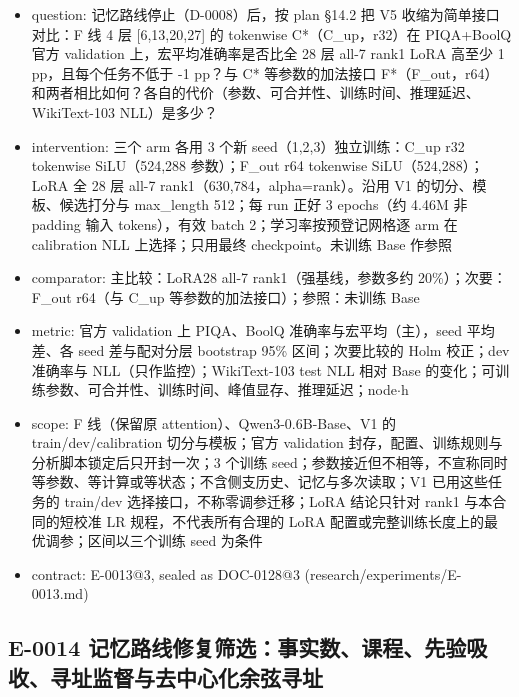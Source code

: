 \documentclass[11pt]{article}
\begin{document}
\begin{itemize}
\item question: 记忆路线停止（D-0008）后，按 plan §14.2 把 V5 收缩为简单接口对比：F 线 4 层 [6,13,20,27] 的 tokenwise C*（C\_up，r32）在 PIQA+BoolQ 官方 validation 上，宏平均准确率是否比全 28 层 all-7 rank1 LoRA 高至少 1 pp，且每个任务不低于 -1 pp？与 C* 等参数的加法接口 F*（F\_out，r64）和两者相比如何？各自的代价（参数、可合并性、训练时间、推理延迟、WikiText-103 NLL）是多少？
\item intervention: 三个 arm 各用 3 个新 seed（1,2,3）独立训练：C\_up r32 tokenwise SiLU（524,288 参数）；F\_out r64 tokenwise SiLU（524,288）；LoRA 全 28 层 all-7 rank1（630,784，alpha=rank）。沿用 V1 的切分、模板、候选打分与 max\_length 512；每 run 正好 3 epochs（约 4.46M 非 padding 输入 tokens），有效 batch 2；学习率按预登记网格逐 arm 在 calibration NLL 上选择；只用最终 checkpoint。未训练 Base 作参照
\item comparator: 主比较：LoRA28 all-7 rank1（强基线，参数多约 20\%）；次要：F\_out r64（与 C\_up 等参数的加法接口）；参照：未训练 Base
\item metric: 官方 validation 上 PIQA、BoolQ 准确率与宏平均（主），seed 平均差、各 seed 差与配对分层 bootstrap 95\% 区间；次要比较的 Holm 校正；dev 准确率与 NLL（只作监控）；WikiText-103 test NLL 相对 Base 的变化；可训练参数、可合并性、训练时间、峰值显存、推理延迟；node\ensuremath{\cdot}h
\item scope: F 线（保留原 attention）、Qwen3-0.6B-Base、V1 的 train/dev/calibration 切分与模板；官方 validation 封存，配置、训练规则与分析脚本锁定后只开封一次；3 个训练 seed；参数接近但不相等，不宣称同时等参数、等计算或等状态；不含侧支历史、记忆与多次读取；V1 已用这些任务的 train/dev 选择接口，不称零调参迁移；LoRA 结论只针对 rank1 与本合同的短校准 LR 规程，不代表所有合理的 LoRA 配置或完整训练长度上的最优调参；区间以三个训练 seed 为条件
\item contract: E-0013@3, sealed as DOC-0128@3 (research/experiments/E-0013.md)
\end{itemize}

\subsection*{E-0014 记忆路线修复筛选：事实数、课程、先验吸收、寻址监督与去中心化余弦寻址}
\end{document}
